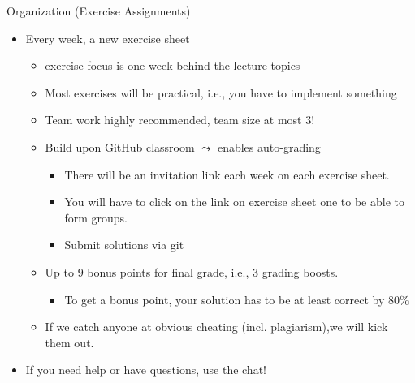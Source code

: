 \documentclass[aspectratio=169]{./latex_main/tntbeamer}  %
\begin{document}
\begin{frame}[c]{Organization (Exercise Assignments)}
	
	\begin{itemize}
	\item Every week, a new exercise sheet
	\begin{itemize}
		\item exercise focus is one week behind the lecture topics
		\item Most exercises will be practical, i.e., you have to implement something
		\item Team work highly recommended, team size at most 3! 
		\pause
		\item Build upon GitHub classroom $\leadsto$ enables auto-grading
		\begin{itemize}
			\item There will be an invitation link each week on each exercise sheet.
			\item You will have to click on the link on exercise sheet one to be able to form groups.
			\item Submit solutions via git
		\end{itemize}
		\pause
		\item Up to \alert{$9$ bonus points} for final grade, i.e., 3 grading boosts.
		\begin{itemize}
		    \item To get a bonus point, your solution has to be at least correct by $80\%$
		\end{itemize}
		\pause
		\item If we catch anyone at obvious cheating (incl. plagiarism),\newline we will kick them out.
	\end{itemize}
	\pause
	\item \alert{If you need help or have questions, use the chat!}
	\end{itemize}
	
\end{frame}
\end{document}
